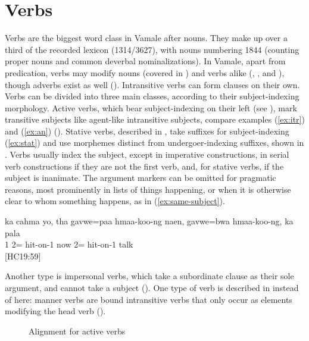 \chapter{Verbs} 
\label{ChapterVerbs} 

Verbs are the biggest word class in Vamale after nouns. They make up over a third of the recorded lexicon (1314/3627), with nouns numbering 1844 (counting proper nouns and common deverbal nominalizations). In Vamale, apart from predication, verbs may modify nouns (covered in ) and verbs alike (, , and ), though adverbs exist as well (). Intransitive verbs can form clauses on their own. Verbs can be divided into three main classes, according to their subject-indexing morphology. Active verbs, which bear subject-indexing on their left (see ), mark transitive subjects like agent-like intransitive subjects, compare examples (\ref{ex:itr}) and (\ref{ex:an}) (). Stative verbs, described in , take suffixes for subject-indexing (\ref{ex:stat}) and use morphemes distinct from undergoer-indexing suffixes, shown in . Verbs usually index the subject, except in imperative constructions, in serial verb constructions if they are not the first verb, and, for stative verbs, if the subject is inanimate. The argument markers can be omitted for pragmatic reasons, most prominently in lists of things happening, or when it is otherwise clear to whom something happens, as in (\ref{ex:same-subject}).

\ea \label{ex:same-subject}\gll ka cahma yo, tha gavwe=paa hmaa-koo-ng naen, gavwe=bwa hmaa-koo-ng, ka pala\\
   1  2= hit-on-1 now 2= hit-on-1  talk\\
\glt {} {[HC19:59]}
\z

Another type is impersonal verbs, which take a subordinate clause as their sole argument, and cannot take a subject (). One type of verb is described in  instead of here: manner verbs are bound intransitive verbs that only occur as elements modifying the head verb (). 


\begin{figure}
	\caption{Alignment for active verbs}
	\label{fig:alignment}
\end{figure}


